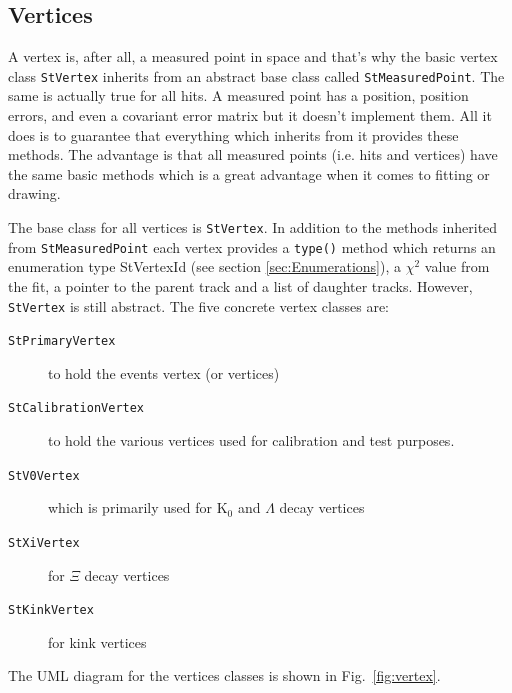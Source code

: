 \documentclass[twoside]{article}
\begin{document}
\subsection{Vertices}
\label{sec:vertices}
  
  

A vertex is, after all, a measured point in space and that's why the
basic vertex class \texttt{StVertex} inherits from an abstract base
class called \texttt{StMeasuredPoint}. The same is actually true for
all hits.  A measured point has a position, position errors, and even
a covariant error matrix but it doesn't implement them. All it does is
to guarantee that everything which inherits from it provides these
methods. The advantage is that all measured points (i.e. hits and
vertices) have the same basic methods which is a great advantage when
it comes to fitting or drawing.

The base class for all vertices is \texttt{StVertex}. In addition to
the methods inherited from \texttt{StMeasuredPoint} each vertex
provides a \texttt{type()} method which returns an enumeration type
StVertexId (see section \ref{sec:Enumerations}), a $\chi^2$ value from
the fit, a pointer to the parent track and a list of daughter tracks.
However, \texttt{StVertex} is still abstract. The five concrete vertex
classes are:
\begin{description}
\item[\texttt{StPrimaryVertex}] to hold the events vertex (or
    vertices)
\item[\texttt{StCalibrationVertex}] to hold the various
    vertices used for calibration and test purposes.
\item[\texttt{StV0Vertex}] which is primarily used for K$_0$ and
    $\Lambda$ decay vertices
\item[\texttt{StXiVertex}] for $\Xi$ decay vertices
\item[\texttt{StKinkVertex}] for kink vertices
\end{description}
The UML diagram for the vertices classes is shown in
Fig.~\ref{fig:vertex}.
\end{document}
